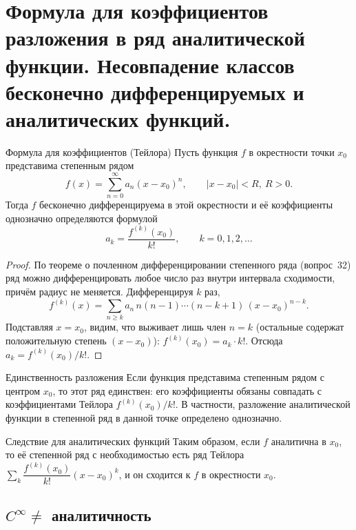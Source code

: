 
\section{Формула для коэффициентов разложения в ряд аналитической функции. Несовпадение классов бесконечно дифференцируемых и аналитических функций.}

\begin{Theorem}{Формула для коэффициентов (Тейлора)}{}
	Пусть функция $f$ в окрестности точки $x_0$ представима степенным рядом
	\[
	f(x) = \sum_{n=0}^{\infty} a_n (x - x_0)^n, \qquad |x - x_0| < R,\ R > 0.
	\]
	Тогда $f$ бесконечно дифференцируема в этой окрестности и её коэффициенты однозначно определяются формулой
	\[
	a_k = \frac{f^{(k)}(x_0)}{k!}, \qquad k = 0, 1, 2, \ldots
	\]
\end{Theorem}

\begin{proof}
	По теореме о почленном дифференцировании степенного ряда (вопрос~32) ряд можно дифференцировать любое число раз внутри интервала сходимости, причём радиус не меняется. Дифференцируя $k$ раз,
	\[
	f^{(k)}(x) = \sum_{n \ge k} a_n\, n(n-1)\cdots(n - k + 1)\,(x - x_0)^{n-k}.
	\]
	Подставляя $x = x_0$, видим, что выживает лишь член $n = k$ (остальные содержат положительную степень $(x - x_0)$): $f^{(k)}(x_0) = a_k \cdot k!$. Отсюда $a_k = f^{(k)}(x_0)/k!$.
\end{proof}

\begin{Corollary}{Единственность разложения}{}
	Если функция представима степенным рядом с центром $x_0$, то этот ряд единствен: его коэффициенты обязаны совпадать с коэффициентами Тейлора $f^{(k)}(x_0)/k!$. В частности, разложение аналитической функции в степенной ряд в данной точке определено однозначно.
\end{Corollary}

\begin{Remark}{Следствие для аналитических функций}{}
	Таким образом, если $f$ аналитична в $x_0$, то её степенной ряд с необходимостью есть ряд Тейлора $\sum_{k} \dfrac{f^{(k)}(x_0)}{k!}(x - x_0)^k$, и он сходится к $f$ в окрестности $x_0$.
\end{Remark}

\subsection*{$C^\infty \neq$ аналитичность}

